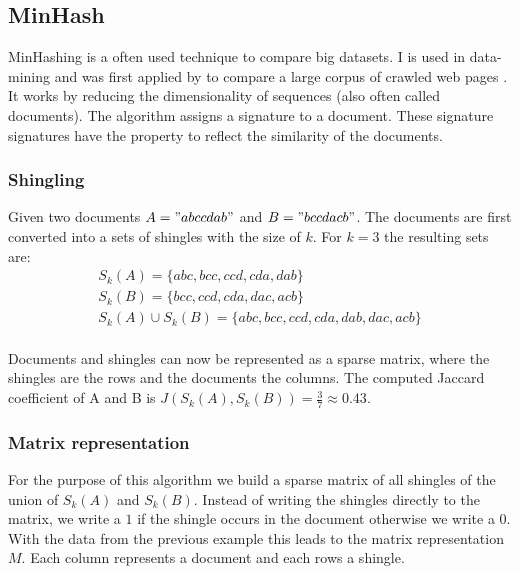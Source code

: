 \subsection{MinHash}
\label{ssec:minhash}

MinHashing is a often used technique to compare big datasets. I is used in data-mining and was first applied by \citeauthor{minhash} to compare a large corpus of crawled web pages \cite{minhash}. It works by reducing the dimensionality of sequences (also often called documents). The algorithm assigns a signature to a document. These signature signatures have the property to reflect the similarity of the documents. \\

\subsubsection{Shingling}

Given two documents $ A = "abccdab" $ and $ B = "bccdacb" $. The documents are first converted into a sets of shingles with the size of $ k $. For $ k = 3 $ the resulting sets are: \\

\begin{equation}
    \begin{split}
        S_k(A) = \{abc, bcc, ccd, cda, dab\} \\
        S_k(B) = \{bcc, ccd, cda, dac, acb\} \\
        S_k(A) \cup S_k(B) = \{abc, bcc, ccd, cda, dab, dac, acb\}
    \end{split}
\end{equation}\\

Documents and shingles can now be represented as a sparse matrix, where the shingles are the rows and the documents the columns. The computed Jaccard coefficient of A and B is  $ J(S_k(A),S_k(B)) = \frac{3}{7} \approx 0.43 $.\\

\subsubsection{Matrix representation}

For the purpose of this algorithm we build a sparse matrix of all shingles of the union of $ S_k(A) $ and $ S_k(B) $. Instead of writing the shingles directly to the matrix, we write a $ 1 $ if the shingle occurs in the document otherwise we write a $ 0 $. With the data from the previous example this leads to  the matrix representation $ M $. Each column represents a document and each rows a shingle. \\


